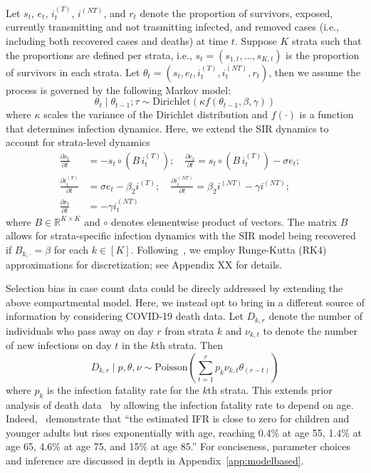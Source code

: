 \documentclass[12pt]{amsart}
\numberwithin{equation}{section}
\theoremstyle{plain}
\begin{document}
Let $s_t$, $e_t$, $i_t^{(T)}$, $i^{(NT)}$, and $r_t$ denote the proportion of survivors, exposed, currently transmitting and not trasmitting infected, and removed cases (i.e., including both recovered cases and deaths) at time $t$.  Suppose $K$ strata such that the proportions are defined per strata, i.e., $s_t = (s_{1,t},\ldots, s_{K,t})$ is the proportion of survivors in each strata. Let $\theta_t = (s_t, e_t, i_t^{(T)}, i_t^{(NT)}, r_t)$, then we assume the process is governed by the following Markov model:
$$
\theta_t \mid \theta_{t-1}; \tau \sim \text{Dirichlet} \left(\kappa f(\theta_{t-1}, \beta, \gamma) \right)
$$
where $\kappa$ scales the variance of the Dirichlet distribution and $f(\cdot)$ is a function that determines infection dynamics.  Here, we extend the SIR dynamics to account for strata-level dynamics
\begin{align*}
\frac{\partial s_t}{\partial t} &= - s_t \circ (B \, i^{(T)}_t); \quad \frac{\partial e_t}{\partial t} = s_t \circ (B \, i^{(T)}_t) - \sigma e_t; \quad \\
\frac{\partial i^{(T)}_t}{\partial t} &= \sigma e_t - \beta_2 i^{(T)}; \quad
\frac{\partial i^{(NT)}_t}{\partial t} = \beta_2 i^{(NT)}  - \gamma i^{(NT)}; \quad \\
\frac{\partial r_t}{\partial t} &= - \gamma i^{(NT)}_t
\end{align*}
where $B \in \mathbb{R}^{K \times K}$ and $\circ$ denotes elementwise product of vectors.  The matrix $B$ allows for strata-specific infection dynamics with the SIR model being recovered if $B_{k,\cdot} = \beta$ for each $k \in [K]$.  Following~\cite{Song2020}, we employ Runge-Kutta (RK4) approximations for discretization; see Appendix XX for details.

Selection bias in case count data could be direcly addressed by extending the above compartmental model.  Here, we instead opt to bring in a different source of information by considering COVID-19 death data.  Let $D_{k,r}$ denote the number of individuals who pass away on day $r$ from strata $k$ and $\nu_{k,t}$ to denote the number of new infections on day $t$ in the $k$th strata.  Then
$$
D_{k,r} \mid p, \theta, \nu \sim \text{Poisson} \left( \sum_{t=1}^r p_{k} \nu_{k,t} \theta_{(r-t)} \right)
$$
where $p_{k}$ is the infection fatality rate for the $k$th strata.  This extends prior analysis of death data~\cite{Johndrow2020} by allowing the infection fatality rate to depend on age.  Indeed,~\cite{Levin2020} demonstrate that ``the estimated IFR is close to zero for children and younger adults but rises exponentially with age, reaching 0.4\% at age 55, 1.4\% at age 65, 4.6\% at age 75, and 15\% at age 85.'' For conciseness, parameter choices and inference are discussed in depth in Appendix~\ref{app:modelbased}.
\end{document}
